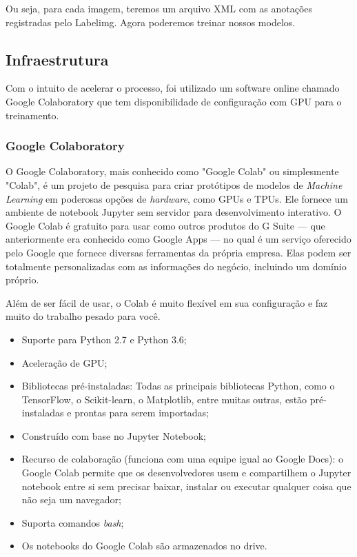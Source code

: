 Ou seja, para cada imagem, teremos um arquivo XML com as anotações registradas pelo Labelimg. Agora poderemos treinar nossos modelos.


\subsection{Infraestrutura}

Com o intuito de acelerar o processo, foi utilizado um software online chamado Google Colaboratory que tem disponibilidade de configuração com GPU para o treinamento. 


\subsubsection{Google Colaboratory}
O Google Colaboratory, mais conhecido como "Google Colab" ou simplesmente "Colab", é um projeto de pesquisa para criar protótipos de modelos de \textit{Machine Learning} em poderosas opções de \textit{hardware}, como GPUs e TPUs. Ele fornece um ambiente de notebook Jupyter sem servidor para desenvolvimento interativo. O Google Colab é gratuito para usar como outros produtos do G Suite — que anteriormente era conhecido como Google Apps — no qual é um serviço oferecido pelo Google que fornece diversas ferramentas da própria empresa. Elas podem ser totalmente personalizadas com as informações do negócio, incluindo um domínio próprio.

Além de ser fácil de usar, o Colab é muito flexível em sua configuração e faz muito do trabalho pesado para você. \cite{colabdetail}

\begin{itemize}
    \item Suporte para Python 2.7 e Python 3.6;
    \item Aceleração de GPU;
    \item Bibliotecas pré-instaladas: Todas as principais bibliotecas Python, como o TensorFlow, o Scikit-learn, o Matplotlib, entre muitas outras, estão pré-instaladas e prontas para serem importadas;
    \item Construído com base no Jupyter Notebook;
    \item Recurso de colaboração (funciona com uma equipe igual ao Google Docs): o Google Colab permite que os desenvolvedores usem e compartilhem o Jupyter notebook entre si sem precisar baixar, instalar ou executar qualquer coisa que não seja um navegador;
    \item Suporta comandos \textit{bash};
    \item Os notebooks do Google Colab são armazenados no drive.
\end{itemize}

